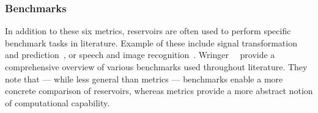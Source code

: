 \subsubsection{Benchmarks} %
In addition to these six metrics, reservoirs are often used to perform specific benchmark tasks in literature.
Example of these include signal transformation and prediction~\cite{AdaptiveProgrammableRC,jaeger2001echo,JaegerHaasWireless,RC_MemristorTemporal,Sunspots_Shougat,gartside2022reconfigurable,appeltant2011information,Vidamour2023}, or speech and image recognition~\cite{farronato2022reservoir,grollier2020neuromorphic,DynamicEmergence_NanomagneticSystem,Vidamour2023}. %
Wringer~\etal~\cite{RCbenchmarksReview1} provide a comprehensive overview of various benchmarks used throughout literature.
They note that --- while less general than metrics --- benchmarks enable a more concrete comparison of reservoirs, whereas metrics provide a more abstract notion of computational capability.

